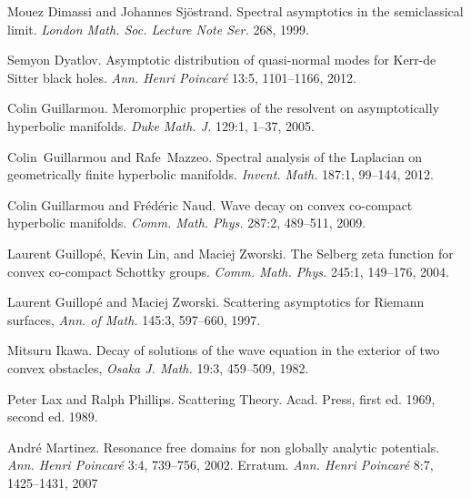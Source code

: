 \documentclass[reqno, 12pt]{amsart}
\theoremstyle{definition}
\numberwithin{equation}{section}
\numberwithin{prop}{section}
\numberwithin{figure}{section}
\begin{document}
\begin{thebibliography}{00}
 Mouez Dimassi and Johannes Sj\"ostrand. Spectral asymptotics in the semiclassical limit. \textit{London Math. Soc. Lecture Note Ser.} 268, 1999.

 Semyon Dyatlov. Asymptotic distribution of quasi-normal modes for Kerr-de Sitter black holes. \textit{Ann. Henri Poincar\'e} 13:5, 1101--1166, 2012.

 Colin Guillarmou. Meromorphic properties of the resolvent on asymptotically hyperbolic manifolds. \textit{Duke Math. J.} 129:1, 1--37, 2005.

 Colin~Guillarmou and Rafe~Mazzeo. Spectral analysis of the Laplacian on geometrically finite hyperbolic manifolds. \textit{Invent. Math.} 187:1, 99--144, 2012.

 Colin Guillarmou and Fr\'ed\'eric Naud. Wave decay on convex co-compact hyperbolic manifolds. \textit{Comm. Math. Phys.} 287:2, 489--511, 2009.

 Laurent Guillop\'e, Kevin Lin, and Maciej Zworski. The Selberg zeta function for convex co-compact Schottky groups. \textit{Comm. Math. Phys.} 245:1, 149--176, 2004.

 Laurent Guillop\'e and Maciej Zworski. Scattering asymptotics for Riemann surfaces, \textit{Ann. of Math.} 145:3, 597--660, 1997.


 Mitsuru Ikawa. Decay of solutions of the wave equation in the exterior of two convex obstacles, \textit{Osaka J. Math.} 19:3, 459--509, 1982.
 


 Peter Lax and Ralph Phillips. Scattering Theory. Acad. Press, first ed. 1969, second ed. 1989.

 Andr\'e Martinez. Resonance free domains for non globally analytic potentials. \textit{Ann. Henri Poincar\'e} 3:4, 739--756, 2002. Erratum.  \textit{Ann. Henri Poincar\'e} 8:7, 1425--1431, 2007


\end{thebibliography}
\end{document}

